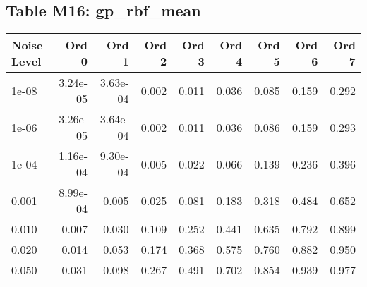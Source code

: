 \documentclass[10pt]{article}
\begin{document}
\clearpage

\subsection*{Table M16: gp\_rbf\_mean}

\begin{longtable}{lrrrrrrrr}
\toprule
\textbf{Noise Level} & \textbf{Ord 0} & \textbf{Ord 1} & \textbf{Ord 2} & \textbf{Ord 3} & \textbf{Ord 4} & \textbf{Ord 5} & \textbf{Ord 6} & \textbf{Ord 7} \\
\midrule
\endhead
1e-08 & 3.24e-05 & 3.63e-04 & 0.002 & 0.011 & 0.036 & 0.085 & 0.159 & 0.292 \\
1e-06 & 3.26e-05 & 3.64e-04 & 0.002 & 0.011 & 0.036 & 0.086 & 0.159 & 0.293 \\
1e-04 & 1.16e-04 & 9.30e-04 & 0.005 & 0.022 & 0.066 & 0.139 & 0.236 & 0.396 \\
0.001 & 8.99e-04 & 0.005 & 0.025 & 0.081 & 0.183 & 0.318 & 0.484 & 0.652 \\
0.010 & 0.007 & 0.030 & 0.109 & 0.252 & 0.441 & 0.635 & 0.792 & 0.899 \\
0.020 & 0.014 & 0.053 & 0.174 & 0.368 & 0.575 & 0.760 & 0.882 & 0.950 \\
0.050 & 0.031 & 0.098 & 0.267 & 0.491 & 0.702 & 0.854 & 0.939 & 0.977 \\
\bottomrule
\end{longtable}

\clearpage
\end{document}
